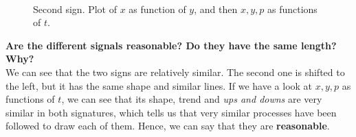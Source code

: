 \documentclass[a4paper]{article}
\begin{document}
{\begin{figure}[H]
  \centering
  \qquad
  \\
  \qquad%
  \caption{Second sign. Plot of $x$ as function of $y$, and then $x,y,p$ as functions of $t$.}
  \label{fig:four:signals:2}
\end{figure}



\textbf{Are the different signals reasonable? Do they have the same length? Why?}\\

We can see that the two signs are relatively similar. The second one is shifted to the left, but it has the same shape and similar lines. If we have a look at $x,y,p$ as functions of $t$, we can see that its shape, trend and \emph{ups and downs} are very similar in both signatures, which tells us that very similar processes have been followed to draw each of them. Hence, we can say that they are \textbf{reasonable}.\\

}
\end{document}

